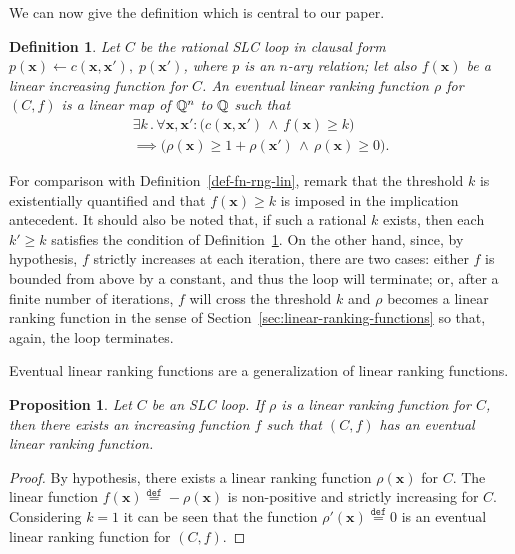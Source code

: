 \documentclass{acm_proc_article-sp}
\newtheorem{proposition}[theorem]{Proposition}
\newtheorem{definition}[theorem]{Definition}
\newcommand{\st}{\mathrel{.}}
\newcommand{\itc}{\mathrel{:}}
\begin{document}
We can now give the definition which is central to our paper.

\begin{definition}
\label{def-fn-rng-lin-evt}
Let $C$ be the rational SLC loop in clausal form
$p(\mathbf{x}) \leftarrow c(\mathbf{x}, \mathbf{x}'), \; p(\mathbf{x}')$,
where $p$ is an $n$-ary relation;
let also $f(\mathbf{x})$ be a linear increasing function for $C$.
An \emph{eventual linear ranking function} $\rho$ for $(C, f)$
is a linear map of $\mathbb{Q}^n$ to $\mathbb{Q}$ such that
\begin{multline*}
  \exists k \st
    \forall \mathbf{x}, \mathbf{x}' \itc
      \bigl(
        c(\mathbf{x}, \mathbf{x}')
        \,\land\,
        f(\mathbf{x}) \ge k
      \bigr) \\
        \implies
          \bigl(
            \rho(\mathbf{x}) \ge 1 + \rho(\mathbf{x}')
            \,\land\,
            \rho(\mathbf{x}) \ge 0
          \bigr).
\end{multline*}
\end{definition}
For comparison with Definition~\ref{def-fn-rng-lin},
remark that the threshold $k$ is existentially quantified
and that $f(\mathbf{x}) \ge k$ is imposed in the implication antecedent.
It should also be noted that, if such a rational $k$ exists,
then each $k' \ge k$ satisfies the condition
of Definition~\ref{def-fn-rng-lin-evt}.
On the other hand, since, by hypothesis, $f$ strictly increases
at each iteration, there are two cases:
either $f$ is bounded from above by a constant, and thus the loop will
terminate;
or, after a finite number of iterations, $f$ will cross the threshold $k$
and $\rho$ becomes a linear ranking function in the sense of
Section~\ref{sec:linear-ranking-functions} so that, again, the loop terminates.

Eventual linear ranking functions are a generalization
of linear ranking functions.

\begin{proposition}
\label{lrf-implies-elrf}
Let $C$ be an SLC loop. If $\rho$ is  a linear ranking function for $C$,
then there exists an increasing function $f$ such that $(C, f)$
has an eventual linear ranking function.
\end{proposition}
\begin{proof}
By hypothesis, there exists a linear ranking function
$\rho(\mathbf{x})$ for $C$.
The linear function $f(\mathbf{x}) \overset{\mathtt{def}}{=} -\rho(\mathbf{x})$
is non-positive and strictly increasing for $C$.
Considering $k = 1$ it can be seen that the function
$\rho'(\mathbf{x})\overset{\mathtt{def}}{=}0$ is an eventual linear
ranking function for $(C, f)$.
\end{proof}
\end{document}
